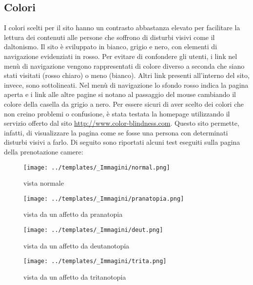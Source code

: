 \subsection{Colori}
I colori scelti per il sito hanno un contrasto abbastanza elevato per facilitare la lettura dei contenuti alle persone che soffrono di disturbi visivi come il daltonismo.
Il sito è sviluppato in bianco, grigio e nero, con elementi di navigazione evidenziati in rosso.
Per evitare di confondere gli utenti, i link nel menù di navigazione vengono rappresentati di colore diverso a seconda che siano stati visitati (rosso chiaro) o meno (bianco). Altri link presenti all'interno del sito, invece, sono sottolineati.
Nel menù di navigazione lo sfondo rosso indica la pagina aperta e i link alle altre pagine si notano al passaggio del mouse cambiando il colore della casella da grigio a nero.
Per essere sicuri di aver scelto dei colori che non creino problemi o confusione, è stata testata la homepage utilizzando il servizio offerto dal sito \underline{\color{Blue}http://www.color-blindness.com}.
Questo sito permette, infatti, di visualizzare la pagina come se fosse una persona con determinati disturbi visivi a farlo.
Di seguito sono riportati alcuni test eseguiti sulla pagina della prenotazione camere:

\begin{figure}[htbp]
	\centering
	\begin{minipage}[c]{.40\textwidth}
		\texttt{[image: ../templates/\_Immagini/normal.png]}
		\caption{vista normale}
	\end{minipage}%
	\hspace{10mm}%
	\begin{minipage}[c]{.40\textwidth}
		\texttt{[image: ../templates/\_Immagini/pranatopia.png]}
		\caption{vista da un affetto da pranatopia}
	\end{minipage}
\end{figure}

\begin{figure}[htbp]
	\centering
	\begin{minipage}[c]{.40\textwidth}
		\texttt{[image: ../templates/\_Immagini/deut.png]}
		\caption{vista da un affetto da deutanotopia}
	\end{minipage}%
	\hspace{10mm}%
	\begin{minipage}[c]{.40\textwidth}
		\texttt{[image: ../templates/\_Immagini/trita.png]}
		\caption{vista da un affetto da tritanotopia}
	\end{minipage}
\end{figure}



